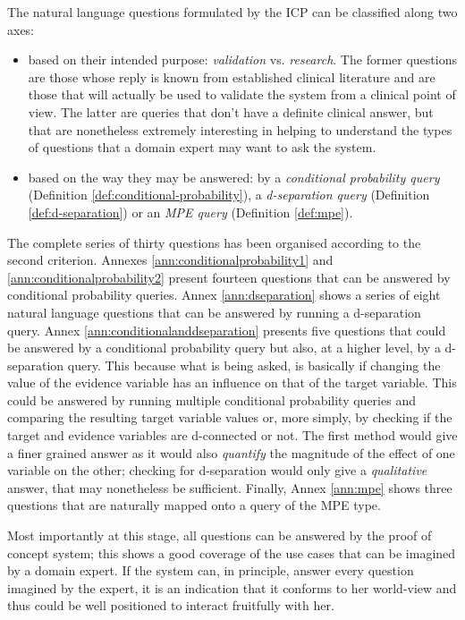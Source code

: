 The natural language questions formulated by the ICP can be classified along two axes:
\begin{itemize}
  \item based on their intended purpose: \textit{validation} vs. \textit{research}.
  The former questions are those whose reply is known from established clinical literature and are those that will actually be used to validate the system from a clinical point of view.
  The latter are queries that don't have a definite clinical answer, but that are nonetheless extremely interesting in helping to understand the types of questions that a domain expert may want to ask the system.
  \item based on the way they may be answered: by a \textit{conditional probability query} (Definition \ref{def:conditional-probability}), a \textit{d-separation query} (Definition \ref{def:d-separation}) or an \textit{MPE query} (Definition \ref{def:mpe}).
\end{itemize}
The complete series of thirty questions has been organised according to the second criterion.
Annexes \ref{ann:conditionalprobability1} and \ref{ann:conditionalprobability2} present fourteen questions that can be answered by conditional probability queries.
Annex \ref{ann:dseparation} shows a series of eight natural language questions that can be answered by running a d-separation query.
Annex \ref{ann:conditionalanddseparation} presents five questions that could be answered by a conditional probability query but also, at a higher level, by a d-separation query.
This because what is being asked, is basically if changing the value of the evidence variable has an influence on that of the target variable.
This could be answered by running multiple conditional probability queries and comparing the resulting target variable values or, more simply, by checking if the target and evidence variables are d-connected or not.
The first method would give a finer grained answer as it would also \textit{quantify} the magnitude of the effect of one variable on the other; checking for d-separation would only give a \textit{qualitative} answer, that may nonetheless be sufficient. 
Finally, Annex \ref{ann:mpe} shows three questions that are naturally mapped onto a query of the MPE type.

Most importantly at this stage, all questions can be answered by the proof of concept system; this shows a good coverage of the use cases that can be imagined by a domain expert.
If the system can, in principle, answer every question imagined by the expert, it is an indication that it conforms to her world-view and thus could be well positioned to interact fruitfully with her.

